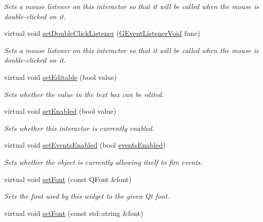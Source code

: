 \begin{DoxyCompactItemize}
\begin{DoxyCompactList}\small\item\em Sets a mouse listener on this interactor so that it will be called when the mouse is double-\/clicked on it. \end{DoxyCompactList}\item 
virtual void \mbox{\hyperlink{classsgl_1_1GInteractor_a50096194d66f48c92dd4c512d41bfc76}{set\+Double\+Click\+Listener}} (\mbox{\hyperlink{namespacesgl_a54427ce97bb1c2804e4fe2b0a62e8b17}{G\+Event\+Listener\+Void}} func)
\begin{DoxyCompactList}\small\item\em Sets a mouse listener on this interactor so that it will be called when the mouse is double-\/clicked on it. \end{DoxyCompactList}\item 
virtual void \mbox{\hyperlink{classsgl_1_1GTextField_a008d7fd44fb3e7a6886cdaddbc3644a2}{set\+Editable}} (bool value)
\begin{DoxyCompactList}\small\item\em Sets whether the value in the text box can be edited. \end{DoxyCompactList}\item 
virtual void \mbox{\hyperlink{classsgl_1_1GInteractor_ab831367dd84bbd579e02e55bacb21343}{set\+Enabled}} (bool value)
\begin{DoxyCompactList}\small\item\em Sets whether this interactor is currently enabled. \end{DoxyCompactList}\item 
virtual void \mbox{\hyperlink{classsgl_1_1GObservable_afaa30b2a9e0f378fd1c70d2f1d0b8216}{set\+Events\+Enabled}} (bool \mbox{\hyperlink{classsgl_1_1GInteractor_a597a370b592e3737d38d9d2f4e2031ea}{events\+Enabled}})
\begin{DoxyCompactList}\small\item\em Sets whether the object is currently allowing itself to fire events. \end{DoxyCompactList}\item 
virtual void \mbox{\hyperlink{classsgl_1_1GInteractor_a2592348886ffea646c6534bf88f7c49d}{set\+Font}} (const Q\+Font \&font)
\begin{DoxyCompactList}\small\item\em Sets the font used by this widget to the given Qt font. \end{DoxyCompactList}\item 
virtual void \mbox{\hyperlink{classsgl_1_1GInteractor_a8e096e8818d838aceae1d46d58fb3a7b}{set\+Font}} (const std\+::string \&font)

\end{DoxyCompactItemize}
